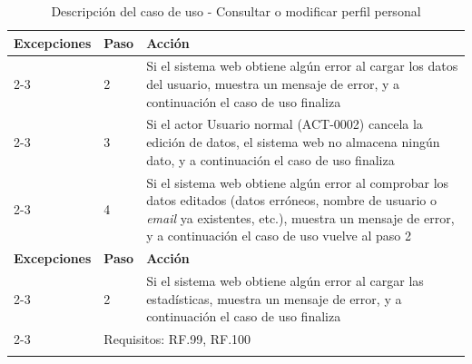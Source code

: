 \documentclass[12pt,a4paper, twoside]{report}
\begin{document}
\begin{longtable}{|p{3cm}|p{1cm}|p{12.5cm}|}
		\multirow{0}{3cm}{\cellcolor{Gainsboro}\textbf{Excepciones}} & \textbf{Paso} & \textbf{Acción} \\ \cline{2-3} 
		\cellcolor{Gainsboro} & 2 & Si el sistema web obtiene algún error al cargar los datos del usuario, muestra un mensaje de error, y a continuación el caso de uso finaliza	 \\ \cline{2-3} 
		\cellcolor{Gainsboro} & 3 & Si el actor Usuario normal (ACT-0002) cancela la edición de datos, el sistema web no almacena ningún dato, y a continuación el caso de uso finaliza \\ \cline{2-3} 
		\cellcolor{Gainsboro} & 4 & Si el sistema web obtiene algún error al comprobar los datos editados (datos erróneos, nombre de usuario o \textit{email} ya existentes, etc.), muestra un mensaje de error, y a continuación el caso de uso vuelve al paso 2			\\ \hline
		
		\multirow{0}{3cm}{\cellcolor{Gainsboro}\textbf{Excepciones}} & \textbf{Paso} & \textbf{Acción} \\ \cline{2-3} 
		\cellcolor{Gainsboro} & 2 & Si el sistema web obtiene algún error al cargar las estadísticas, muestra un mensaje de error, y a continuación el caso de uso finaliza	\\ \cline{2-3} 
						
		\multicolumn{1}{|>{\columncolor{Gainsboro}}p{3cm}|}{\textbf{Comentarios}} & \multicolumn{2}{p{13.5cm}|}{Requisitos: RF.99, RF.100} \\ \hline
		\caption{Descripción del caso de uso - Consultar o modificar perfil personal}
	\end{longtable}
	
	\vspace{0.3cm}
	
\end{document}
